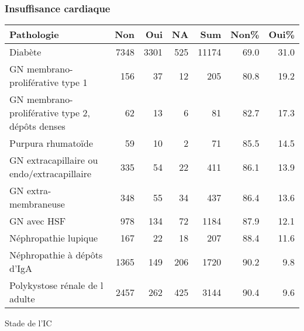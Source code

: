 \documentclass[11pt,a4paper]{article}\usepackage[]{graphicx}\usepackage[]{color}
\begin{document}
\subsubsection*{Insuffisance cardiaque}

\begin{table}[H]
\centering
\begin{tabular}{lrrrrrr}
  \hline
Pathologie & Non & Oui & NA & Sum & Non\% & Oui\% \\ 
  \hline
Diabète & 7348 & 3301 & 525 & 11174 & 69.0 & 31.0 \\ 
  GN membrano-proliférative type 1 & 156 & 37 & 12 & 205 & 80.8 & 19.2 \\ 
  GN membrano-proliférative type 2, dépôts denses & 62 & 13 &  6 & 81 & 82.7 & 17.3 \\ 
  Purpura rhumatoïde & 59 & 10 &  2 & 71 & 85.5 & 14.5 \\ 
  GN extracapillaire ou endo/extracapillaire & 335 & 54 & 22 & 411 & 86.1 & 13.9 \\ 
  GN extra-membraneuse & 348 & 55 & 34 & 437 & 86.4 & 13.6 \\ 
  GN avec HSF & 978 & 134 & 72 & 1184 & 87.9 & 12.1 \\ 
  Néphropathie lupique & 167 & 22 & 18 & 207 & 88.4 & 11.6 \\ 
  Néphropathie à dépôts d'IgA & 1365 & 149 & 206 & 1720 & 90.2 & 9.8 \\ 
  Polykystose rénale de l adulte & 2457 & 262 & 425 & 3144 & 90.4 & 9.6 \\ 
   \hline
\end{tabular}
\end{table}


Stade de l’IC
\end{document}

